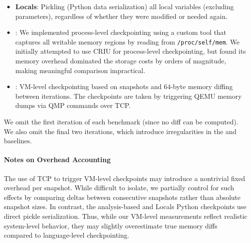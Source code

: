 \begin{itemize}[leftmargin=*]
  \item \textbf{Locals}: Pickling (Python data serialization) all local variables (excluding parameters), regardless of whether they were modified or needed again.
  \item \textbf{\PROCDIFF}: We implemented process-level checkpointing using a custom tool that captures all writable memory regions by reading from \texttt{/proc/self/mem}. We initially attempted to use CRIU for process-level checkpointing, but found its memory overhead dominated the storage costs by orders of magnitude, making meaningful comparison impractical. 
  \item \textbf{\VMDIFF}: VM-level checkpointing based on snapshots and 64-byte memory diffing between iterations. The checkpoints are taken by triggering QEMU memory dumps via QMP commands over TCP.
\end{itemize}

We omit the first iteration of each benchmark (since no diff can be computed). We also omit the final two iterations, which introduce irregularities in the {\PROCDIFF} and {\VMDIFF} baselines.

\paragraph{Notes on Overhead Accounting}
The use of TCP to trigger VM-level checkpoints may introduce a nontrivial fixed overhead per snapshot. While difficult to isolate, we partially control for such effects by comparing deltas between consecutive snapshots rather than absolute snapshot sizes. In contrast, the analysis-based and Locals Python checkpoints use direct pickle serialization. Thus, while our VM-level measurements reflect realistic system-level behavior, they may slightly overestimate true memory diffs compared to language-level checkpointing.

